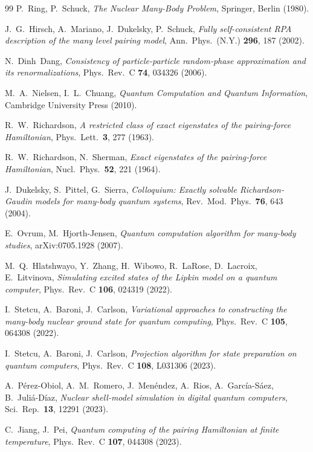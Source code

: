 \documentclass[
  aps,            %
  prc,            %
  reprint,        %
  superscriptaddress,
  floatfix,
  nofootinbib
]{revtex4-2}
\begin{document}
\begin{thebibliography}{99}
P.~Ring, P.~Schuck,
\textit{The Nuclear Many-Body Problem},
Springer, Berlin (1980).

J.~G.~Hirsch, A.~Mariano, J.~Dukelsky, P.~Schuck,
\textit{Fully self-consistent RPA description of the many level pairing model},
Ann.\ Phys.\ (N.Y.) \textbf{296}, 187 (2002).

N.~Dinh~Dang,
\textit{Consistency of particle-particle random-phase approximation and its
renormalizations},
Phys.\ Rev.\ C \textbf{74}, 034326 (2006).

M.~A.~Nielsen, I.~L.~Chuang,
\textit{Quantum Computation and Quantum Information},
Cambridge University Press (2010).

R.~W.~Richardson,
\textit{A restricted class of exact eigenstates of the pairing-force Hamiltonian},
Phys.\ Lett.\ \textbf{3}, 277 (1963).

R.~W.~Richardson, N.~Sherman,
\textit{Exact eigenstates of the pairing-force Hamiltonian},
Nucl.\ Phys.\ \textbf{52}, 221 (1964).

J.~Dukelsky, S.~Pittel, G.~Sierra,
\textit{Colloquium: Exactly solvable Richardson-Gaudin models for many-body
quantum systems},
Rev.\ Mod.\ Phys.\ \textbf{76}, 643 (2004).

E.~Ovrum, M.~Hjorth-Jensen,
\textit{Quantum computation algorithm for many-body studies},
arXiv:0705.1928 (2007).

M.~Q.~Hlatshwayo, Y.~Zhang, H.~Wibowo, R.~LaRose, D.~Lacroix, E.~Litvinova,
\textit{Simulating excited states of the Lipkin model on a quantum computer},
Phys.\ Rev.\ C \textbf{106}, 024319 (2022).

I.~Stetcu, A.~Baroni, J.~Carlson,
\textit{Variational approaches to constructing the many-body nuclear ground state
for quantum computing},
Phys.\ Rev.\ C \textbf{105}, 064308 (2022).

I.~Stetcu, A.~Baroni, J.~Carlson,
\textit{Projection algorithm for state preparation on quantum computers},
Phys.\ Rev.\ C \textbf{108}, L031306 (2023).

A.~P\'erez-Obiol, A.~M.~Romero, J.~Men\'endez, A.~Rios, A.~Garc\'ia-S\'aez,
B.~Juli\'a-D\'iaz,
\textit{Nuclear shell-model simulation in digital quantum computers},
Sci.\ Rep.\ \textbf{13}, 12291 (2023).

C.~Jiang, J.~Pei,
\textit{Quantum computing of the pairing Hamiltonian at finite temperature},
Phys.\ Rev.\ C \textbf{107}, 044308 (2023).


\end{thebibliography}
\end{document}
